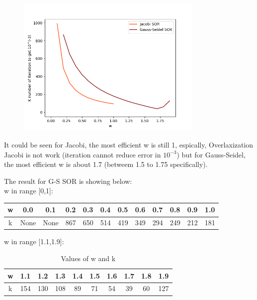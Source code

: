 \documentclass[12pt]{article}
\begin{document}
\begin{figure}[H]
    \centering
    \includegraphics[width=0.8\textwidth]{SOR diagram.png}
    \label{SOR diagram.png}
\end{figure}

It could be seen for Jacobi, the most efficient w is still 1, espically,
Overlaxization Jacobi is not work (iteration cannot reduce error in $10^{-3}$) but for 
Gauss-Seidel, the most efficient w is about 1.7 (betweem 1.5 to 1.75 
specifically).

The result for G-S SOR is showing below:\\


w in range [0,1]:

\begin{table}[h]
    \centering
    \begin{tabular}{cccccccccccc}
    \hline
    w & 0.0 & 0.1 & 0.2 & 0.3 & 0.4 & 0.5 & 0.6 & 0.7 & 0.8 & 0.9 & 1.0 \\ \hline
    k & None & None & 867 & 650 & 514 & 419 & 349 & 294 & 249 & 212 & 181 \\ \hline
    \end{tabular}
\end{table}

w in range [1.1,1.9]:
\begin{table}[h]
    \centering
    

    \begin{tabular}{cccccccccc}
    \hline
    w & 1.1 & 1.2 & 1.3 & 1.4 & 1.5 & 1.6 & 1.7 & 1.8 & 1.9 \\ \hline
    k & 154 & 130 & 108 & 89 & 71 & 54 & 39 & 60 & 127 \\ \hline
    \end{tabular}
    \caption{Values of w and k}
\end{table}
\end{document}
